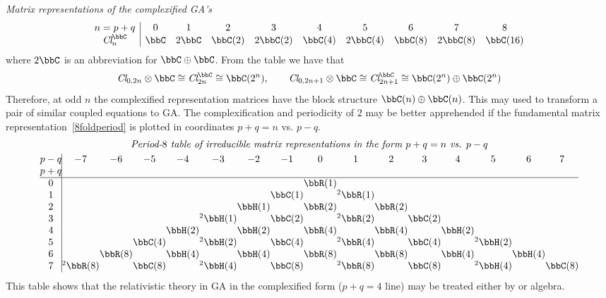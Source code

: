 \begin{unit}
\vspace{2mm} \textit{Matrix representations of the complexified
GA's}
\[\begin{array}{c|ccccccccc}
n=p+q&0&1&2&3&4&5&6&7&8\\
\textit{Cl}_n^{\bbC}&\bbC&{2\bbC}&\bbC(2)&{2\bbC(2)}
&\bbC(4)&{2\bbC(4)}&\bbC(8)&{2\bbC(8)}&\bbC(16)
\end{array}\]
where ${2\bbC}$ is an abbreviation for
$\bbC\oplus\bbC$. From the table we have that
\[\textit{Cl}_{0,2n}\otimes\bbC\cong\textit{Cl}_{2n}^{\bbC}\cong\bbC(2^n),\qquad
\textit{Cl}_{0,2n+1}\otimes\bbC\cong\textit{Cl}_{2n+1}^{\bbC}\cong\bbC(2^n)\oplus\bbC(2^n)
\]
Therefore, at odd $n$ the complexified  representation matrices
have the block structure $\bbC(n)\oplus\bbC(n)$. This
may used to transform a pair of similar coupled equations to GA.
The complexification and periodicity of $2$ may be better
apprehended if the fundamental matrix
representation~\ref{8foldperiod} is plotted in coordinates $p+q=n$
vs. $p-q$.
%
$$
\setlength{\arraycolsep}{0pt}%
\begin{array}{c|ccccccccccccccc}
\multicolumn{16}{c}{\textit{Period-$8$ table of irreducible
matrix representations in the form $p+q=n$ vs. $p-q$}}\\[3pt]
 p-q&-7&-6&-5&-4&-3&-2&-1&0&1&2&3&4&5&6&7\\
 p+q& & & & & & & & & & & & & & &\\ \hline
 0&  & & & & & & &\bbR(1)&& & & & & &\\
 1& & & & & & &\bbC(1)&&^2\bbR(1)& & & & & &\\
 2& & & & & &\bbH(1) & &\bbR(2) &&\bbR(2)& & & & &\\
 3& & & & &^2\bbH(1) &&\bbC(2) &&^2\bbR(2)& &\bbC(2)& & & &\\
 4& & & &\bbH(2) &&\bbH(2) &&\bbR(4) &&\bbR(4)&&\bbH(2) & & &\\
 5& &&\bbC(4)&&^2\bbH(2) &&\bbC(4) &&^2\bbR(4)& &\bbC(4)&&^2\bbH(2) & &\\
 6& &\bbR(8)&&\bbH(4) &&\bbH(4) &&\bbR(8)&&\bbR(8)&&\bbH(4) &&\bbH(4) &\\
 7&^2\bbR(8)&&\bbC(8)& &^2\bbH(4)&&\bbC(8)&&^2\bbR(8)& &\bbC(8)&&^2\bbH(4)&&\bbC(8)\\
\end{array}
$$
This table shows that the relativistic theory in GA in the
complexified form ($p+q=4$ line) may be treated either by
 or  algebra.
 \end{unit}
%
